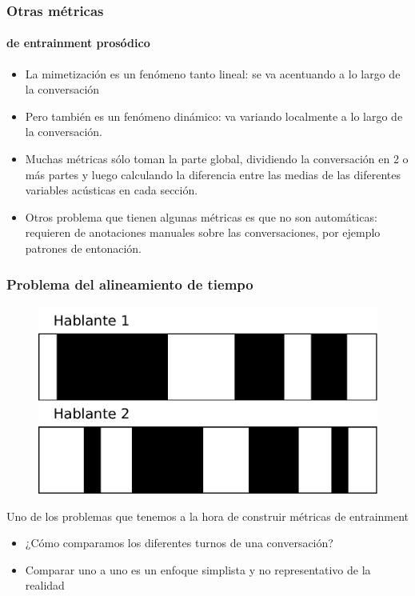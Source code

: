 \begin{frame}
  \frametitle{Otras métricas}
  \framesubtitle{de entrainment prosódico}
  \begin{itemize}
    \item La mimetización es un fenómeno tanto lineal: se va acentuando a lo largo de la conversación
    \item Pero también es un fenómeno dinámico: va variando localmente a lo largo de la conversación.
    \item Muchas métricas sólo toman la parte global, dividiendo la conversación en 2 o más partes y luego calculando la diferencia entre las medias de las diferentes variables acústicas en cada sección.

    \item Otros problema que tienen algunas métricas es que no son automáticas: requieren de anotaciones manuales sobre las conversaciones, por ejemplo patrones de entonación.
  \end{itemize}

\end{frame}


\begin{frame}
  \frametitle{Problema del alineamiento de tiempo}

  \begin{figure}[t]
    \includegraphics[scale=0.40]{images/conversation_turns.pdf}
  \end{figure}
  Uno de los problemas que tenemos a la hora de construir métricas de entrainment

  \begin{itemize}
    \item ¿Cómo comparamos los diferentes turnos de una conversación?
    \item Comparar uno a uno es un enfoque simplista y no representativo de la realidad
  \end{itemize}
\end{frame}


